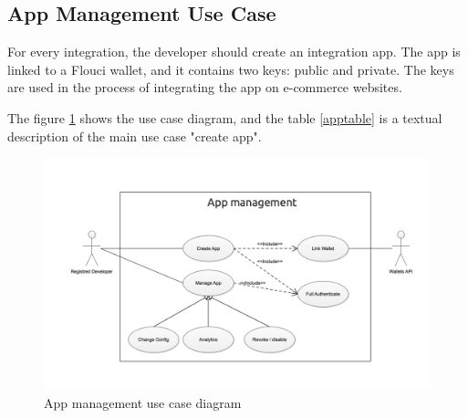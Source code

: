 \begin{spacing}{1.2}
\subsection{App Management Use Case}
For every integration, the developer should create an integration app.
The app is linked to a Flouci wallet, and it contains two keys: public and private.
The keys are used in the process of integrating the app on e-commerce websites.


The figure \ref{appmanagementusecase} shows the use case diagram, and the table \ref{apptable} is a textual description of the main use case "create app".
\begin{figure}[H]\centering
\includegraphics[scale=0.3]{appusecase.png}
\caption{App management use case diagram}
\label{appmanagementusecase}
\end{figure}


\end{spacing}

